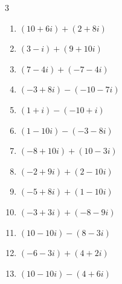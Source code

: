 \begin{multicols}{3}
\begin{enumerate}
        \phantom{$\displaystyle =-3$}

  \item $\displaystyle (10+6i) + (2+8i)$

        \phantom{$\displaystyle =12+14i$}

  \item $\displaystyle (3-i) + (9+10i)$

        \phantom{$\displaystyle =12+9i$}

  \item $\displaystyle (7-4i) + (-7-4i)$

        \phantom{$\displaystyle =-8i$}

  \item $\displaystyle (-3+8i) - (-10-7i)$

        \phantom{$\displaystyle =7+15i$}

  \item $\displaystyle (1+i) - (-10+i)$

        \phantom{$\displaystyle =11$}

  \item $\displaystyle (1-10i) - (-3-8i)$

        \phantom{$\displaystyle =4-2i$}

  \item $\displaystyle (-8+10i) + (10-3i)$

        \phantom{$\displaystyle =2+7i$}

  \item $\displaystyle (-2+9i) + (2-10i)$

        \phantom{$\displaystyle =-i$}

  \item $\displaystyle (-5+8i) + (1-10i)$

        \phantom{$\displaystyle =-4-2i$}

  \item $\displaystyle (-3+3i) + (-8-9i)$

        \phantom{$\displaystyle =-11-6i$}

  \item $\displaystyle (10-10i) - (8-3i)$

        \phantom{$\displaystyle =2-7i$}

  \item $\displaystyle (-6-3i) + (4+2i)$

        \phantom{$\displaystyle =-2-i$}

  \item $\displaystyle (10-10i) - (4+6i)$


\end{enumerate}
\end{multicols}
